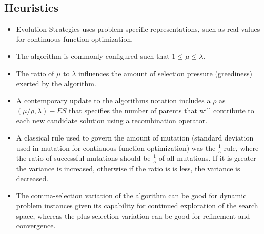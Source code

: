 \subsection{Heuristics}
\begin{itemize}
	\item Evolution Strategies uses problem specific representations, such as real values for continuous function optimization.
	\item The algorithm is commonly configured such that $1 \leq \mu \leq \lambda$.
	\item The ratio of $\mu$ to $\lambda$ influences the amount of selection pressure (greediness) exerted by the algorithm.
	\item A contemporary update to the algorithms notation includes a $\rho$ as $(\mu/\rho,\lambda)-ES$ that specifies the number of parents that will contribute to each new candidate solution using a recombination operator. 
	\item A classical rule used to govern the amount of mutation (standard deviation used in mutation for continuous function optimization) was the $\frac{1}{5}$-rule, where the ratio of successful mutations should be $\frac{1}{5}$ of all mutations. If it is greater the variance is increased, otherwise if the ratio is is less, the variance is decreased.
	\item The comma-selection variation of the algorithm can be good for dynamic problem instances given its capability for continued exploration of the search space, whereas the plus-selection variation can be good for refinement and convergence.
\end{itemize}

